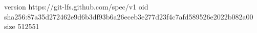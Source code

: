version https://git-lfs.github.com/spec/v1
oid sha256:87a35d272462e9d6b3df93b6a26eceb3e277d23f4c7afd589526e2022b082a00
size 512551
